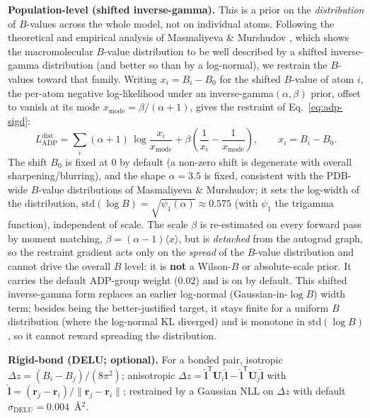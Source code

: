 \documentclass{iucrjournals}
\begin{document}
\textbf{Population-level (shifted inverse-gamma).} This is a prior on the
\emph{distribution} of $B$-values across the whole model, not on individual
atoms.  Following the theoretical and empirical analysis of Masmaliyeva \&
Murshudov \cite{masmaliyeva_analysis_2019,masmaliyeva_local_2020}, which shows the
macromolecular $B$-value distribution to be well described by a shifted
inverse-gamma distribution (and better so than by a log-normal), we restrain the
$B$-values toward that family.  Writing $x_{i} = B_{i} - B_{0}$ for the shifted
$B$-value of atom $i$, the per-atom negative log-likelihood under an
inverse-gamma$(\alpha,\beta)$ prior, offset to vanish at its mode
$x_\mathrm{mode} = \beta/(\alpha+1)$, gives the restraint of
Eq.~\ref{eq:adp-sigd}:
%
\begin{equation}
  L_\mathrm{ADP}^{\mathrm{dist}} = \sum_{i}
  (\alpha + 1)\,\log\frac{x_{i}}{x_\mathrm{mode}}
  + \beta\left(\frac{1}{x_{i}} - \frac{1}{x_\mathrm{mode}}\right),
  \qquad x_{i} = B_{i} - B_{0}.
  \label{eq:adp-sigd}
\end{equation}
%
The shift $B_{0}$ is fixed at $0$ by default (a non-zero shift is degenerate with
overall sharpening/blurring), and the shape $\alpha = 3.5$ is fixed, consistent
with the PDB-wide $B$-value distributions of Masmaliyeva \& Murshudov; it sets the
log-width of the distribution, $\mathrm{std}(\log B) = \sqrt{\psi_{1}(\alpha)} \approx 0.575$ (with
$\psi_{1}$ the trigamma function), independent of scale.  The scale $\beta$ is
re-estimated on every forward pass by moment matching,
$\beta = (\alpha - 1)\langle x\rangle$, but is \emph{detached} from the autograd
graph, so the restraint gradient acts only on the \emph{spread} of the $B$-value
distribution and cannot drive the overall $B$ level: it is \textbf{not} a
Wilson-$B$ or absolute-scale prior.  It carries the default ADP-group weight
($0.02$) and is on by default.  This shifted inverse-gamma form replaces an
earlier log-normal (Gaussian-in-$\log B$) width term; besides being the
better-justified target, it stays finite for a uniform $B$ distribution (where the
log-normal KL diverged) and is monotone in $\mathrm{std}(\log B)$, so it cannot
reward spreading the distribution.

\textbf{Rigid-bond (DELU; optional).} For a bonded pair, isotropic
$\Delta z = (B_{i} - B_{j})/(8\pi^{2})$; anisotropic
$\Delta z = \widehat{\mathbf{l}}^{\mathsf{T}}\mathbf{U}_{i}\widehat{\mathbf{l}}
- \widehat{\mathbf{l}}^{\mathsf{T}}\mathbf{U}_{j}\widehat{\mathbf{l}}$ with
$\widehat{\mathbf{l}} = (\mathbf{r}_{j} - \mathbf{r}_{i})/
\lVert\mathbf{r}_{j} - \mathbf{r}_{i}\rVert$; restrained by a Gaussian NLL on
$\Delta z$ with default $\sigma_\mathrm{DELU} = 0.004$~\AA$^{2}$.
\end{document}
